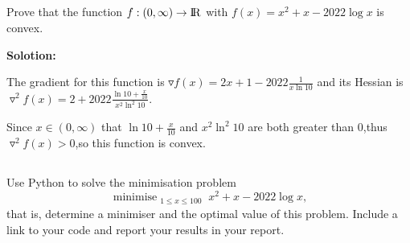 \documentclass[a4paper,11pt,reqno]{amsart}
\newcommand{\R}{{\rm I\!R}}
\DeclareMathOperator*{\minimise}{minimise}
\begin{document}
\subsection{}
Prove that the function $f:(0,\infty) \rightarrow \R $ with $f(x) = x^2+x-2022 \log x$ is convex.

\textbf{Solotion:}


The gradient for this function is $\triangledown f(x) = 2x+1-2022\frac{1}{x\ln 10}$ and 
its Hessian is $\triangledown^2f(x) = 2+2022\frac{\ln10+\frac{x}{10}}{x^2\ln^{2}10}$.

Since $x\in(0,\infty)$ that $\ln10+\frac{x}{10}$ and $x^2\ln^{2}10$ are both greater than 0,thus
$\triangledown^2f(x) > 0$,so this function is convex.

\subsection{}
Use Python to solve the minimisation problem 
\begin{equation}
\minimise_{\substack{1\leq x \leq 100}}x^2+x-2022 \log x,
\label{17}
\end{equation}
that is, determine a minimiser and the optimal value of this problem. Include a link to your code and report your results in your report.
\end{document}
